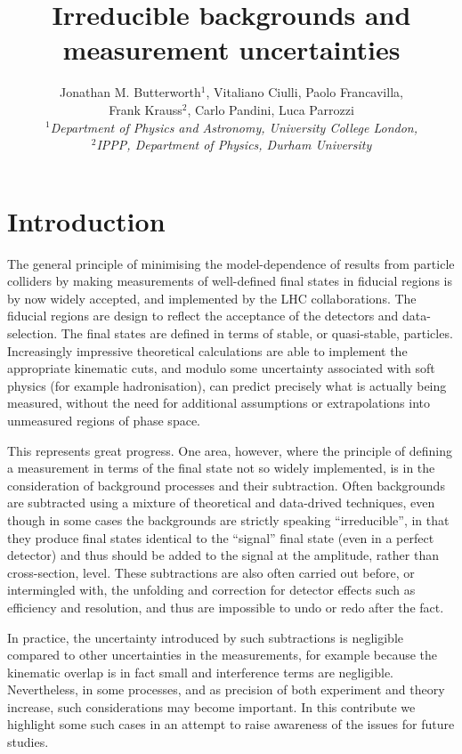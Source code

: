 \documentclass[floatfix]{article}
\title{Irreducible backgrounds and measurement uncertainties}
\author{Jonathan M. Butterworth$^1$, Vitaliano Ciulli, Paolo Francavilla,\\ Frank Krauss$^2$, Carlo Pandini, Luca Parrozzi \\
\it $^1$Department of Physics and Astronomy, University College London,\\ 
\it $^2$IPPP, Department of Physics, Durham University}
\begin{document}
\maketitle 

\begin{abstract}
\end{abstract}

\section{Introduction}
\label{sec:intro}

The general principle of minimising the model-dependence of results from particle colliders by making measurements of 
well-defined final states in fiducial regions is by now widely accepted, and implemented by the LHC collaborations. 
The fiducial regions are design to reflect  the acceptance of the detectors and data-selection. 
The final states are defined in terms of stable, or quasi-stable,
particles. Increasingly impressive theoretical calculations are able to implement the appropriate kinematic cuts, and
modulo some uncertainty associated with soft physics (for example hadronisation), can predict precisely what 
is actually being measured, without the need for additional assumptions or extrapolations into unmeasured regions of 
phase space.

This represents great progress. One area, however, where the principle of defining a measurement in terms of the final state
not so widely implemented, is in the consideration of background processes and their subtraction. 
Often backgrounds are subtracted using a mixture of theoretical and data-drived techniques, 
even though in some cases the backgrounds are strictly speaking ``irreducible'', in that they produce final states 
identical to the ``signal'' final state (even in a perfect detector) and thus should be added to the signal 
at the amplitude, rather than cross-section, level. These subtractions are also often carried out before, or intermingled with, 
the unfolding and correction for detector effects such as efficiency and resolution, and thus are impossible to
undo or redo after the fact. 

In practice, the uncertainty introduced by such subtractions is negligible compared to other uncertainties in the measurements, 
for example because the kinematic overlap
is in fact small and interference terms are negligible. Nevertheless, in some processes, and as precision of both experiment
and theory increase, such considerations may become important. In this contribute we highlight some such cases in an attempt 
to raise awareness of the issues for future studies. 
\end{document}

